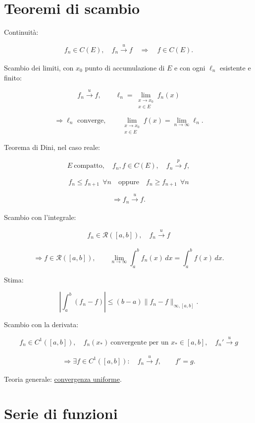 \section{Teoremi di scambio}\label{teoremi-di-scambio}

Continuità:

\[
\displaystyle
f_n\in C(E),\quad
f_n\xrightarrow[]{u}f
\quad\Longrightarrow\quad
f\in C(E).
\]

Scambio dei limiti, con \(x_0\) punto di accumulazione di \(E\) e con ogni \(\ell_n\) esistente e finito:

\[
\displaystyle
f_n\xrightarrow[]{u}f,\qquad
\ell_n=\lim_{\substack{x\to x_0\\x\in E}}f_n(x)
\]

\[
\displaystyle
\Longrightarrow
\ell_n\text{ converge},
\qquad
\lim_{\substack{x\to x_0\\x\in E}}f(x)
=
\lim_{n\to\infty}\ell_n.
\]

Teorema di Dini, nel caso reale:

\[
\displaystyle
E\ \text{compatto},\quad
f_n,f\in C(E),\quad
f_n\xrightarrow[]{p}f,
\]

\[
\displaystyle
f_n\le f_{n+1}\ \ \forall n
\quad\text{oppure}\quad
f_n\ge f_{n+1}\ \ \forall n
\]

\[
\displaystyle
\Longrightarrow
f_n\xrightarrow[]{u}f.
\]

Scambio con l'integrale:

\[
\displaystyle
f_n\in\mathcal R([a,b]),\quad
f_n\xrightarrow[]{u}f
\]

\[
\displaystyle
\Longrightarrow
f\in\mathcal R([a,b]),
\qquad
\lim_{n\to\infty}\int_a^b f_n(x)\,dx
=
\int_a^b f(x)\,dx.
\]

Stima:

\[
\displaystyle
\left\lvert\int_a^b(f_n-f)\right\rvert
\le
(b-a)\lVert f_n-f\rVert_{\infty,[a,b]}.
\]

Scambio con la derivata:

\[
\displaystyle
f_n\in C^1([a,b]),\quad
f_n(x_\ast)\ \text{convergente per un }x_\ast\in[a,b],
\quad
f_n'\xrightarrow[]{u}g
\]

\[
\displaystyle
\Longrightarrow
\exists f\in C^1([a,b]):
\quad
f_n\xrightarrow[]{u}f,
\qquad
f'=g.
\]

Teoria generale: \href{https://ingegnerismo.it/matematica/convergenza-uniforme/}{convergenza uniforme}.

\section{Serie di funzioni}\label{serie-di-funzioni}

